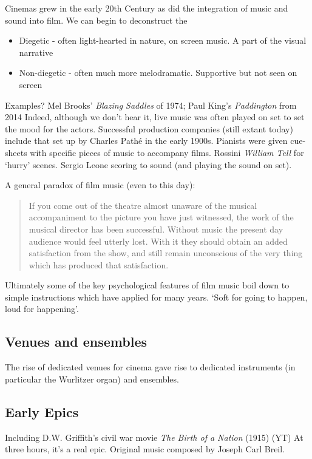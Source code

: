 Cinemas grew in the early 20th Century as did the integration of music and sound into film. We can begin to deconstruct the 
\begin{itemize}
\item Diegetic - often light-hearted in nature, on screen music. A part of the visual narrative
\item Non-diegetic - often much more melodramatic. Supportive but not seen on screen
\end{itemize}
Examples? Mel Brooks' \textit{Blazing Saddles} of 1974; Paul King's \textit{Paddington} from 2014
Indeed, although we don't hear it, live music was often played on set to set the mood for the actors. Successful production companies (still extant today) include that set up by Charles Path\'e in the early 1900s. Pianists were given cue-sheets with specific pieces of music to accompany films. Rossini \textit{William Tell} for `hurry' scenes. Sergio Leone 
scoring to sound (and playing the sound on set). 

A general paradox of film music (even to this day):
\begin{quotation}
If you come out of the theatre almost unaware of the musical accompaniment to the picture you have just witnessed, the work of the musical director has been successful. Without music the present day audience would feel utterly lost. With it they should obtain an added satisfaction from the show, and still remain unconscious of the very thing which has produced that satisfaction. 
\end{quotation}

Ultimately some of the key psychological features of film music boil down to simple instructions which have applied for many years. `Soft for going to happen, loud for happening'. 

\subsection{Venues and ensembles}
The rise of dedicated venues for cinema gave rise to dedicated instruments (in particular the Wurlitzer organ) and ensembles. 

\subsection{Early Epics}
Including D.W. Griffith's civil war movie \textit{The Birth of a Nation} (1915) (YT)
At three hours, it's a real epic. Original music composed by Joseph Carl Breil.

